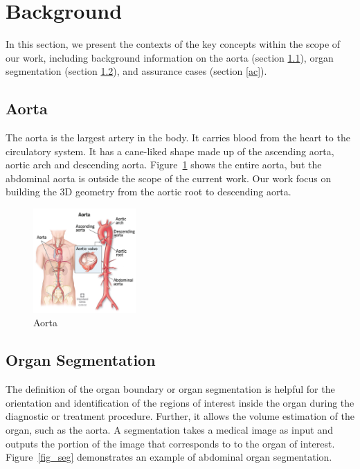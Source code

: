 \section{Background} \label{bg}

In this section, we present the contexts of the key concepts within the scope of our work, including background information on the aorta (section \ref{aorta}), organ segmentation (section \ref{organ_seg}), and assurance cases (section \ref{ac}).

\subsection{Aorta}\label{aorta}
The aorta is the largest artery in the body. It carries blood from the heart to the circulatory system. It has a cane-liked shape made up of the ascending aorta, aortic arch and descending aorta. Figure~\ref{fig_aorta} shows the entire aorta, but the abdominal aorta is outside the scope of the current work. Our work focus on building the 3D geometry from the aortic root to descending aorta.

\begin{figure}[ht]
    \centering
    \includegraphics[width=0.35\textwidth]{figures/Intro/Aorta.png}
    \caption[Aorta]{Aorta \cite{Cleveland_Clinic_medical_professional_2021}}
    \label{fig_aorta}
\end{figure}

\subsection{Organ Segmentation}\label{organ_seg}
The definition of the organ boundary or organ segmentation is helpful for the orientation and identification of the regions of interest inside the organ during the diagnostic or treatment procedure. Further, it allows the volume estimation of the organ, such as the aorta. A segmentation takes a medical image as input and outputs the portion of the image that corresponds to to the organ of interest. Figure~\ref{fig_seg} demonstrates an example of abdominal organ segmentation.

